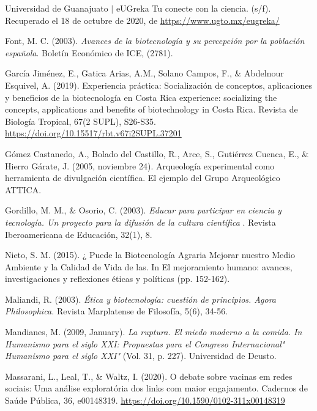 \documentclass[12pt]{article}
\begin{document}
\begin{thebibliography}{X}
	 Universidad de Guanajuato $|$ eUGreka Tu conecte con la ciencia. (s/f). Recuperado el 18 de octubre de 2020, de \url{https://www.ugto.mx/eugreka/}
	
	Font, M. C. (2003). \textit{ Avances de la biotecnología y su percepción por la población española}. Boletín Económico de ICE, (2781).
	
	 García Jiménez, E., Gatica Arias, A.M., Solano Campos, F., \& Abdelnour Esquivel, A. (2019). Experiencia práctica: Socialización de conceptos, aplicaciones y beneficios de la biotecnología en Costa Rica experience: socializing the concepts, applications and benefits of biotechnology in Costa Rica. Revista de Biología Tropical, 67(2 SUPL), S26-S35. \url{https://doi.org/10.15517/rbt.v67i2SUPL.37201}
	
	 Gómez Castanedo, A., Bolado del Castillo, R., Arce, S., Gutiérrez Cuenca, E., \& Hierro Gárate, J. (2005, noviembre 24). Arqueología experimental como herramienta de divulgación científica. El ejemplo del Grupo Arqueológico ATTICA.
	
	 Gordillo, M. M., \& Osorio, C. (2003). \textit{ Educar para participar en ciencia y tecnología. Un proyecto para la difusión de la cultura científica }. Revista Iberoamericana de Educación, 32(1), 8.
	
	 Nieto, S. M. (2015). ¿ Puede la Biotecnología Agraria Mejorar nuestro Medio Ambiente y la Calidad de Vida de las. In El mejoramiento humano: avances, investigaciones y reflexiones éticas y políticas (pp. 152-162).
	
	 Maliandi, R. (2003). \textit{ Ética y biotecnología: cuestión de principios. Agora Philosophica. } Revista Marplatense de Filosofía, 5(6), 34-56.
	
	 Mandianes, M. (2009, January). \textit{ La ruptura. El miedo moderno a la comida. In Humanismo para el siglo XXI: Propuestas para el Congreso Internacional" Humanismo para el siglo XXI" } (Vol. 31, p. 227). Universidad de Deusto.
	
	 Massarani, L., Leal, T., \& Waltz, I. (2020). O debate sobre vacinas em redes sociais: Uma análise exploratória dos links com maior engajamento. Cadernos de Saúde Pública, 36, e00148319. \url{https://doi.org/10.1590/0102-311x00148319}
	

\end{thebibliography}
\end{document}
